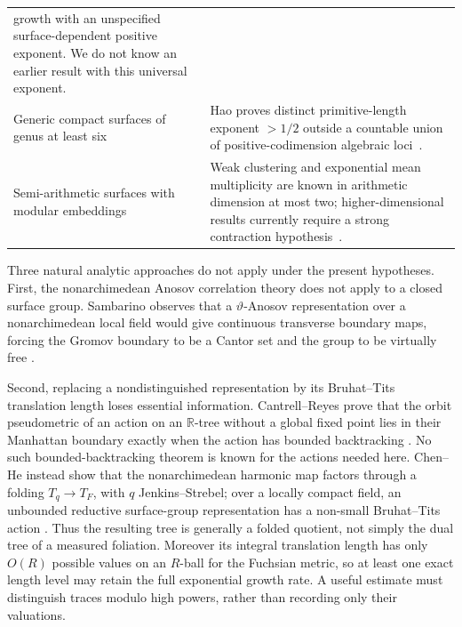 \documentclass[11pt,reqno]{amsart}
\theoremstyle{definition}
\theoremstyle{remark}
\newcommand{\R}{\mathbb R}
\begin{document}
\begin{center}
\begin{tabular}{p{}p{}}
growth with an unspecified surface-dependent positive exponent.  We do not
know an earlier result with this universal exponent.\\
Generic compact surfaces of genus at least six
& Hao proves distinct primitive-length exponent \(>1/2\) outside a countable
union of positive-codimension algebraic loci~\cite{HaoLengthSets}.\\
Semi-arithmetic surfaces with modular embeddings
& Weak clustering and exponential mean multiplicity are known in arithmetic
dimension at most two; higher-dimensional results currently require a strong
contraction hypothesis~\cite{BCDPmultiplicities,Zuevsky}.\\
\bottomrule
\end{tabular}
\end{center}

Three natural analytic approaches do not apply under the present
hypotheses.  First, the nonarchimedean Anosov correlation theory does not
apply to a closed surface group.  Sambarino observes that a
\(\vartheta\)-Anosov representation over a nonarchimedean local field would
give continuous transverse boundary maps, forcing the Gromov boundary to be
a Cantor set and the group to be virtually free
\cite[Remark~5.2.6]{SambarinoDichotomy}.

Second, replacing a nondistinguished representation by its Bruhat--Tits translation
length loses essential information.  Cantrell--Reyes prove that the orbit
pseudometric of an action on an \(\R\)-tree without a global fixed point lies in their
Manhattan boundary exactly when the action has bounded backtracking
\cite[Proposition~6.7]{CantrellReyes}.  No such bounded-backtracking theorem
is known for the actions needed here.  Chen--He instead show that the
nonarchimedean harmonic map factors through a folding
\(T_q\to T_F\), with \(q\) Jenkins--Strebel; over a locally compact field,
an unbounded reductive surface-group representation has a non-small
Bruhat--Tits action
\cite[Theorems~1.2--1.3 and Proposition~2.15]{ChenHe}.  Thus the resulting tree
is generally a folded quotient, not simply the dual tree of a measured
foliation.  Moreover its integral translation length has only \(O(R)\)
possible values on an \(R\)-ball for the Fuchsian metric, so at least one
exact length level may retain the full exponential growth rate.  A useful
estimate must distinguish traces modulo high powers, rather than recording
only their valuations.
\end{document}
